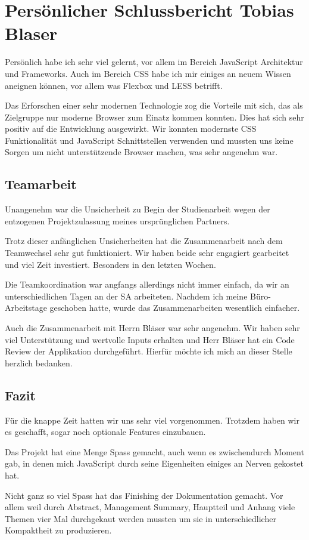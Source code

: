 \section{Persönlicher Schlussbericht Tobias Blaser}	
	Persönlich habe ich sehr viel gelernt, vor allem im Bereich JavaScript Architektur und Frameworks. Auch im Bereich CSS habe ich mir einiges an neuem Wissen aneignen können, vor allem was Flexbox und LESS betrifft.
	
	Das Erforschen einer sehr modernen Technologie zog die Vorteile mit sich, das als Zielgruppe nur moderne Browser zum Einatz kommen konnten. Dies hat sich sehr positiv auf die Entwicklung ausgewirkt. Wir konnten modernste CSS Funktionalität und JavaScript Schnittstellen verwenden und mussten uns keine Sorgen um nicht unterstützende Browser machen, was sehr angenehm war.
	
	\subsection{Teamarbeit}		
		Unangenehm war die Unsicherheit zu Begin der Studienarbeit wegen der entzogenen Projektzulassung meines ursprünglichen Partners.
	
		Trotz dieser anfänglichen Unsicherheiten hat die Zusammenarbeit nach dem Teamwechsel sehr gut funktioniert. Wir haben beide sehr engagiert gearbeitet und viel Zeit investiert. Besonders in den letzten Wochen.
		
		Die Teamkoordination war angfangs allerdings nicht immer einfach, da wir an unterschiedlichen Tagen an der SA arbeiteten. Nachdem ich meine Büro-Arbeitstage geschoben hatte, wurde das Zusammenarbeiten wesentlich einfacher.

		Auch die Zusammenarbeit mit Herrn Bläser war sehr angenehm. Wir haben sehr viel Unterstützung und wertvolle Inputs erhalten und Herr Bläser hat ein Code Review der Applikation durchgeführt. Hierfür möchte ich mich an dieser Stelle herzlich bedanken.
			
	
	\subsection{Fazit}		
		Für die knappe Zeit hatten wir uns sehr viel vorgenommen. Trotzdem haben wir es geschafft, sogar noch optionale Features einzubauen.
		
		Das Projekt hat eine Menge Spass gemacht, auch wenn es zwischendurch Moment gab, in denen mich JavaScript durch seine Eigenheiten einiges an Nerven gekostet hat.
	
		Nicht ganz so viel Spass hat das Finishing der Dokumentation gemacht. Vor allem weil durch Abstract, Management Summary, Hauptteil und Anhang viele Themen vier Mal durchgekaut werden mussten um sie in unterschiedlicher Kompaktheit zu produzieren.

		
	
	